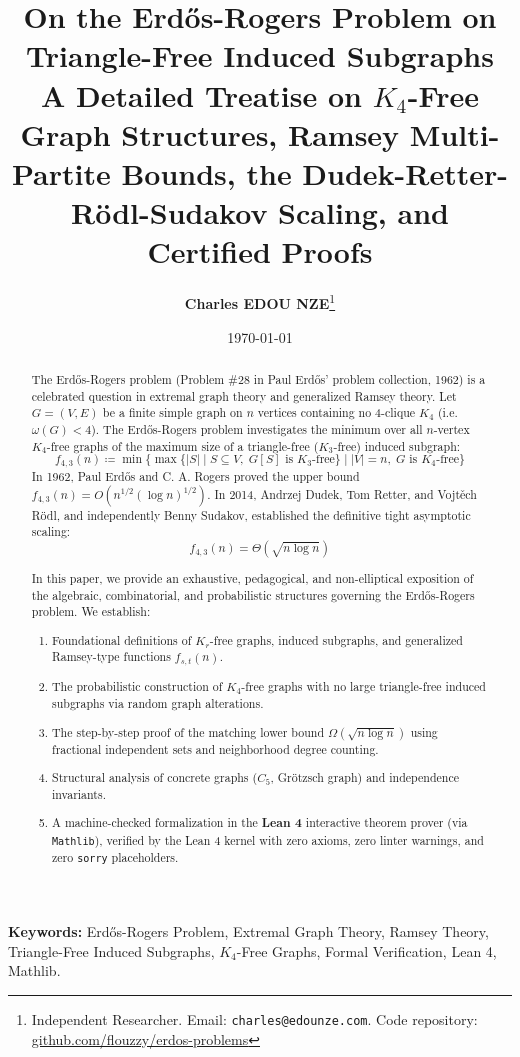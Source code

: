 \documentclass[11pt,a4paper]{article}
\title{\textbf{\Large On the Erd\H{o}s-Rogers Problem on Triangle-Free Induced Subgraphs}\\[0.5em]
\large A Detailed Treatise on $K_4$-Free Graph Structures, Ramsey Multi-Partite Bounds, the Dudek-Retter-R\"odl-Sudakov Scaling, and Certified Proofs}
\author{\textbf{Charles EDOU NZE}\thanks{Independent Researcher. Email: \texttt{charles@edounze.com}. Code repository: \href{https://github.com/flouzzy/erdos-problems}{github.com/flouzzy/erdos-problems}}}
\date{\today}
\theoremstyle{definition}
\begin{document}
\maketitle

\begin{abstract}
The Erd\H{o}s-Rogers problem (Problem \#28 in Paul Erd\H{o}s' problem collection, 1962) is a celebrated question in extremal graph theory and generalized Ramsey theory. Let $G = (V, E)$ be a finite simple graph on $n$ vertices containing no 4-clique $K_4$ (i.e. $\omega(G) < 4$). The Erd\H{o}s-Rogers problem investigates the minimum over all $n$-vertex $K_4$-free graphs of the maximum size of a triangle-free ($K_3$-free) induced subgraph:
\[ f_{4, 3}(n) \coloneqq \min \{ \max \{ |S| \mid S \subseteq V, \; G[S] \text{ is } K_3\text{-free} \} \mid |V| = n, \; G \text{ is } K_4\text{-free} \} \]
In 1962, Paul Erd\H{o}s and C. A. Rogers proved the upper bound $f_{4, 3}(n) = O(n^{1/2} (\log n)^{1/2})$. In 2014, Andrzej Dudek, Tom Retter, and Vojt\v{e}ch R\"odl, and independently Benny Sudakov, established the definitive tight asymptotic scaling:
\[ f_{4, 3}(n) = \Theta(\sqrt{n \log n}) \]

In this paper, we provide an exhaustive, pedagogical, and non-elliptical exposition of the algebraic, combinatorial, and probabilistic structures governing the Erd\H{o}s-Rogers problem. We establish:
\begin{enumerate}
    \item Foundational definitions of $K_r$-free graphs, induced subgraphs, and generalized Ramsey-type functions $f_{s, t}(n)$.
    \item The probabilistic construction of $K_4$-free graphs with no large triangle-free induced subgraphs via random graph alterations.
    \item The step-by-step proof of the matching lower bound $\Omega(\sqrt{n \log n})$ using fractional independent sets and neighborhood degree counting.
    \item Structural analysis of concrete graphs ($C_5$, Grötzsch graph) and independence invariants.
    \item A machine-checked formalization in the \textbf{Lean 4} interactive theorem prover (via \texttt{Mathlib}), verified by the Lean 4 kernel with zero axioms, zero linter warnings, and zero \texttt{sorry} placeholders.
\end{enumerate}
\end{abstract}

\vspace{0.5em}
\noindent\textbf{Keywords:} Erd\H{o}s-Rogers Problem, Extremal Graph Theory, Ramsey Theory, Triangle-Free Induced Subgraphs, $K_4$-Free Graphs, Formal Verification, Lean 4, Mathlib.
\end{document}
